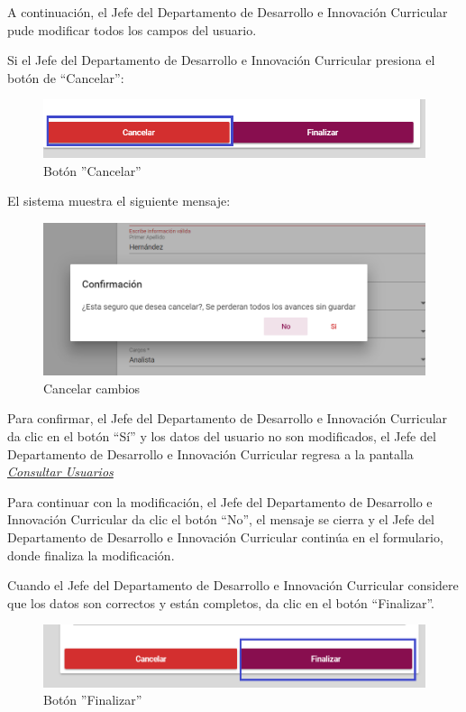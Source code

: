 A continuación, el Jefe del Departamento de Desarrollo e Innovación Curricular pude modificar todos los campos del usuario.

Si el Jefe del Departamento de Desarrollo e Innovación Curricular presiona el botón de “Cancelar”:

\begin{figure}[H]
	\centering
	\hypertarget{cancel2}{\includegraphics[width=0.7\linewidth]{images/SP5/BtnCancelar2}}
	\caption{Botón ''Cancelar''}
	\label{cancel2}
\end{figure}

El sistema muestra el siguiente mensaje:
\clearpage
\begin{figure}[H]
	\centering
	\includegraphics[width=0.4\linewidth]{images/SP5/MSG29}
	\caption{Cancelar cambios}
	\label{mensaje29}
	
\end{figure}

Para confirmar, el Jefe del Departamento de Desarrollo e Innovación Curricular da clic en el botón “Sí” y los datos del usuario no son modificados, el Jefe del Departamento de Desarrollo e Innovación Curricular regresa a la pantalla \hyperlink{consultarUs}{\textit{Consultar Usuarios}}

Para continuar con la modificación, el Jefe del Departamento de Desarrollo e Innovación Curricular  da clic el botón “No”, el mensaje se cierra y el Jefe del Departamento de Desarrollo e Innovación Curricular continúa en el formulario, donde finaliza la modificación.

Cuando el Jefe del Departamento de Desarrollo e Innovación Curricular considere que los datos son correctos y están completos, da clic en el botón “Finalizar”.
\begin{figure}[H]
	\centering
	\hypertarget{btnfin}{\includegraphics[width=0.7\linewidth]{images/SP5/BtnFinalizar}}
	\caption{Botón ''Finalizar''}
	\label{btnfin}
\end{figure}

